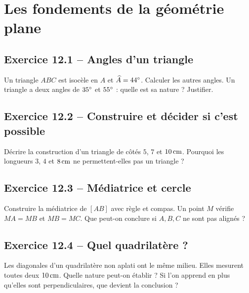 \chapter{Les fondements de la géométrie plane}
\label{exercices:12}
\section*{Exercice 12.1 -- Angles d'un triangle}
Un triangle $ABC$ est isocèle en $A$ et $\widehat A=44^{\circ}$. Calculer les autres angles. Un triangle a deux angles de $35^{\circ}$ et $55^{\circ}$ : quelle est sa nature ? Justifier.

\section*{Exercice 12.2 -- Construire et décider si c'est possible}
Décrire la construction d'un triangle de côtés $5$, $7$ et $10\,\mathrm{cm}$. Pourquoi les longueurs $3$, $4$ et $8\,\mathrm{cm}$ ne permettent-elles pas un triangle ?

\section*{Exercice 12.3 -- Médiatrice et cercle}
Construire la médiatrice de $[AB]$ avec règle et compas. Un point $M$ vérifie $MA=MB$ et $MB=MC$. Que peut-on conclure si $A,B,C$ ne sont pas alignés ?

\section*{Exercice 12.4 -- Quel quadrilatère ?}
Les diagonales d'un quadrilatère non aplati ont le même milieu. Elles mesurent toutes deux $10\,\mathrm{cm}$. Quelle nature peut-on établir ? Si l'on apprend en plus qu'elles sont perpendiculaires, que devient la conclusion ?
